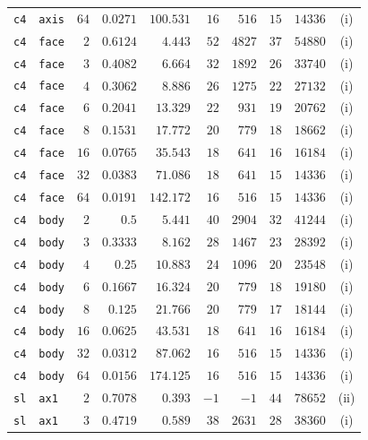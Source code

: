 \begin{longtable}{llrrrrrrrc}
\texttt{c4} & \texttt{axis} & $64$ & $0.0271$ & $100.531$ & $16$ & $516$ & $15$ & $14336$ & (i) \\
\texttt{c4} & \texttt{face} & $2$ & $0.6124$ & $4.443$ & $52$ & $4827$ & $37$ & $54880$ & (i) \\
\texttt{c4} & \texttt{face} & $3$ & $0.4082$ & $6.664$ & $32$ & $1892$ & $26$ & $33740$ & (i) \\
\texttt{c4} & \texttt{face} & $4$ & $0.3062$ & $8.886$ & $26$ & $1275$ & $22$ & $27132$ & (i) \\
\texttt{c4} & \texttt{face} & $6$ & $0.2041$ & $13.329$ & $22$ & $931$ & $19$ & $20762$ & (i) \\
\texttt{c4} & \texttt{face} & $8$ & $0.1531$ & $17.772$ & $20$ & $779$ & $18$ & $18662$ & (i) \\
\texttt{c4} & \texttt{face} & $16$ & $0.0765$ & $35.543$ & $18$ & $641$ & $16$ & $16184$ & (i) \\
\texttt{c4} & \texttt{face} & $32$ & $0.0383$ & $71.086$ & $18$ & $641$ & $15$ & $14336$ & (i) \\
\texttt{c4} & \texttt{face} & $64$ & $0.0191$ & $142.172$ & $16$ & $516$ & $15$ & $14336$ & (i) \\
\texttt{c4} & \texttt{body} & $2$ & $0.5$ & $5.441$ & $40$ & $2904$ & $32$ & $41244$ & (i) \\
\texttt{c4} & \texttt{body} & $3$ & $0.3333$ & $8.162$ & $28$ & $1467$ & $23$ & $28392$ & (i) \\
\texttt{c4} & \texttt{body} & $4$ & $0.25$ & $10.883$ & $24$ & $1096$ & $20$ & $23548$ & (i) \\
\texttt{c4} & \texttt{body} & $6$ & $0.1667$ & $16.324$ & $20$ & $779$ & $18$ & $19180$ & (i) \\
\texttt{c4} & \texttt{body} & $8$ & $0.125$ & $21.766$ & $20$ & $779$ & $17$ & $18144$ & (i) \\
\texttt{c4} & \texttt{body} & $16$ & $0.0625$ & $43.531$ & $18$ & $641$ & $16$ & $16184$ & (i) \\
\texttt{c4} & \texttt{body} & $32$ & $0.0312$ & $87.062$ & $16$ & $516$ & $15$ & $14336$ & (i) \\
\texttt{c4} & \texttt{body} & $64$ & $0.0156$ & $174.125$ & $16$ & $516$ & $15$ & $14336$ & (i) \\
\texttt{sl} & \texttt{ax1} & $2$ & $0.7078$ & $0.393$ & $-1$ & $-1$ & $44$ & $78652$ & (ii) \\
\texttt{sl} & \texttt{ax1} & $3$ & $0.4719$ & $0.589$ & $38$ & $2631$ & $28$ & $38360$ & (i) \\

\end{longtable}
